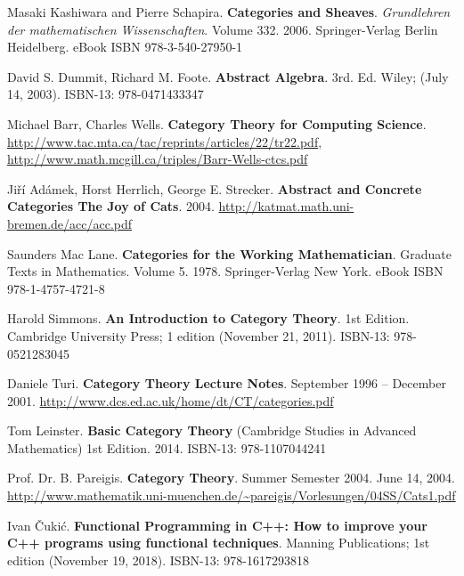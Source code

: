 




Masaki Kashiwara and Pierre Schapira. \textbf{Categories and Sheaves}.  \emph{Grundlehren der mathematischen Wissenschaften}.  Volume 332.  2006. Springer-Verlag Berlin Heidelberg.  eBook ISBN 978-3-540-27950-1








David S. Dummit, Richard M. Foote. \textbf{Abstract Algebra}. 3rd. Ed.  Wiley; (July 14, 2003). ISBN-13: 978-0471433347 




Michael Barr, Charles Wells.  \textbf{Category Theory for Computing Science}.  \url{http://www.tac.mta.ca/tac/reprints/articles/22/tr22.pdf}, \url{http://www.math.mcgill.ca/triples/Barr-Wells-ctcs.pdf}
 
Ji\v{r}\'{i} Ad\'{a}mek, Horst Herrlich, George E. Strecker.   \textbf{Abstract and Concrete Categories The Joy of Cats}. 2004.  \url{http://katmat.math.uni-bremen.de/acc/acc.pdf}

Saunders Mac Lane. \textbf{Categories for the Working Mathematician}. Graduate Texts in Mathematics. Volume 5. 1978. Springer-Verlag New York. eBook ISBN
978-1-4757-4721-8

Harold Simmons. \textbf{An Introduction to Category Theory}. 1st Edition. Cambridge University Press; 1 edition (November 21, 2011). ISBN-13: 978-0521283045

Daniele Turi. \textbf{Category Theory Lecture Notes}.  September 1996 – December 2001.  \url{http://www.dcs.ed.ac.uk/home/dt/CT/categories.pdf}

Tom Leinster.  \textbf{Basic Category Theory} (Cambridge Studies in Advanced Mathematics) 1st Edition.  2014.  ISBN-13: 978-1107044241

Prof. Dr. B. Pareigis. \textbf{Category Theory}. Summer Semester 2004. June 14, 2004. \url{http://www.mathematik.uni-muenchen.de/~pareigis/Vorlesungen/04SS/Cats1.pdf}

Ivan \v{C}uki\'{c}. \textbf{Functional Programming in C++: How to improve your C++ programs using functional techniques}. Manning Publications; 1st edition (November 19, 2018). ISBN-13: 978-1617293818





